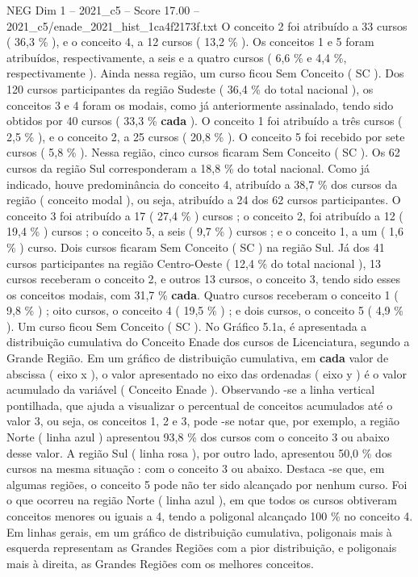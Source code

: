 \begin{textsample}{NEG Dim 1 – 2021\_c5 – Score 17.00 – 2021\_c5/enade\_2021\_hist\_1ca4f2173f.txt}
O conceito 2 foi atribuído a 33 cursos ( 36,3 \% ), e o conceito 4, a 12 cursos ( 13,2 \% ).
Os conceitos 1 e 5 foram atribuídos, respectivamente, a seis e a quatro cursos ( 6,6 \% e 4,4 \%, respectivamente ).
Ainda nessa região, um curso ficou Sem Conceito ( SC ).
Dos 120 cursos participantes da região Sudeste ( 36,4 \% do total nacional ), os conceitos 3 e 4 foram os modais, como já anteriormente assinalado, tendo sido obtidos por 40 cursos ( 33,3 \% \textbf{cada} ).
O conceito 1 foi atribuído a três cursos ( 2,5 \% ), e o conceito 2, a 25 cursos ( 20,8 \% ).
O conceito 5 foi recebido por sete cursos ( 5,8 \% ).
Nessa região, cinco cursos ficaram Sem Conceito ( SC ).
Os 62 cursos da região Sul corresponderam a 18,8 \% do total nacional.
Como já indicado, houve predominância do conceito 4, atribuído a 38,7 \% dos cursos da região ( conceito modal ), ou seja, atribuído a 24 dos 62 cursos participantes.
O conceito 3 foi atribuído a 17 ( 27,4 \% ) cursos ; o conceito 2, foi atribuído a 12 ( 19,4 \% ) cursos ; o conceito 5, a seis ( 9,7 \% ) cursos ; e o conceito 1, a um ( 1,6 \% ) curso.
Dois cursos ficaram Sem Conceito ( SC ) na região Sul.
Já dos 41 cursos participantes na região Centro-Oeste ( 12,4 \% do total nacional ), 13 cursos receberam o conceito 2, e outros 13 cursos, o conceito 3, tendo sido esses os conceitos modais, com 31,7 \% \textbf{cada}.
Quatro cursos receberam o conceito 1 ( 9,8 \% ) ; oito cursos, o conceito 4 ( 19,5 \% ) ; e dois cursos, o conceito 5 ( 4,9 \% ).
Um curso ficou Sem Conceito ( SC ).
No Gráfico 5.1a, é apresentada a distribuição cumulativa do Conceito Enade dos cursos de Licenciatura, segundo a Grande Região.
Em um gráfico de distribuição cumulativa, em \textbf{cada} valor de abscissa ( eixo x ), o valor apresentado no eixo das ordenadas ( eixo y ) é o valor acumulado da variável ( Conceito Enade ).
Observando -se a linha vertical pontilhada, que ajuda a visualizar o percentual de conceitos acumulados até o valor 3, ou seja, os conceitos 1, 2 e 3, pode -se notar que, por exemplo, a região Norte ( linha azul ) apresentou 93,8 \% dos cursos com o conceito 3 ou abaixo desse valor.
A região Sul ( linha rosa ), por outro lado, apresentou 50,0 \% dos cursos na mesma situação : com o conceito 3 ou abaixo.
Destaca -se que, em algumas regiões, o conceito 5 pode não ter sido alcançado por nenhum curso.
Foi o que ocorreu na região Norte ( linha azul ), em que todos os cursos obtiveram conceitos menores ou iguais a 4, tendo a poligonal alcançado 100 \% no conceito 4.
Em linhas gerais, em um gráfico de distribuição cumulativa, poligonais mais à esquerda representam as Grandes Regiões com a pior distribuição, e poligonais mais à direita, as Grandes Regiões com os melhores conceitos.

\end{textsample}
